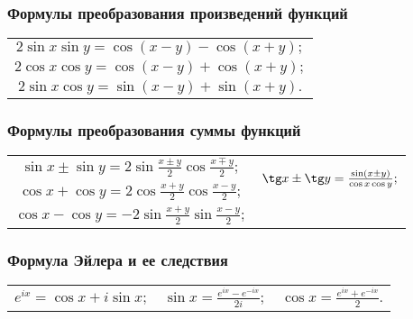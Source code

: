 \subsubsection{Формулы преобразования произведений функций}
\begin{tabular}{c}
$2\sin x \sin y = \cos (x-y)-\cos(x+y);$
\\
$2\cos x \cos y = \cos (x-y)+\cos(x+y);$
\\
$2\sin x \cos y = \sin (x-y)+\sin(x+y).$
\end{tabular}

\subsubsection{Формулы преобразования суммы функций}
\begin{tabular}{ c c}
$\sin x\pm \sin y =2 \sin \frac{x\pm y}{2} \cos \frac{x\mp y}{2};$
&
\multirow{2}{*}{$\tg x \pm \tg y = \frac{\sin (x \pm y)}{ \cos x \cos y};$}
\\
$\cos x + \cos y  = 2 \cos \frac{x + y}{2} \cos \frac{x - y}{2};$
&
\multirow{2}{*}{$\ctg x \pm \tg y = \frac{\sin (y \pm x)}{ \sin x \sin y}.$}
\\
$\cos x - \cos y  = -2 \sin \frac{x + y}{2} \sin\frac{x - y}{2};$
&
$ $
\end{tabular}
  
\subsubsection{Формула Эйлера и ее следствия}
\begin{tabular}{c c c}
$e^{ix} = \cos x + i \sin x;$
&
$\sin x = \frac{e^{ix}-e^{-ix}}{2i};$
&
$\cos x = \frac{e^{ix}+e^{-ix}}{2}.$
\end{tabular}

